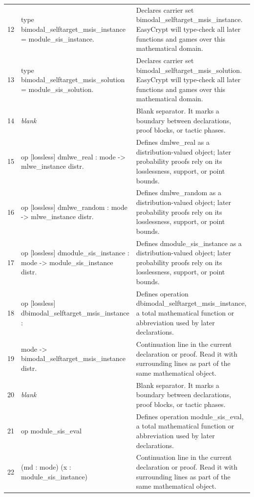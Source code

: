 \documentclass[10pt]{article}
\begin{document}
\begin{longtable}{r L{0.53\textwidth} L{0.37\textwidth}}
12 & {\ttfamily\scriptsize type bimodal\_selftarget\_msis\_instance = module\_sis\_instance.} & Declares carrier set bimodal\_selftarget\_msis\_instance.  EasyCrypt will type-check all later functions and games over this mathematical domain. \\
13 & {\ttfamily\scriptsize type bimodal\_selftarget\_msis\_solution = module\_sis\_solution.} & Declares carrier set bimodal\_selftarget\_msis\_solution.  EasyCrypt will type-check all later functions and games over this mathematical domain. \\
14 & {\ttfamily\scriptsize \emph{blank}} & Blank separator.  It marks a boundary between declarations, proof blocks, or tactic phases. \\
15 & {\ttfamily\scriptsize op [lossless] dmlwe\_real : mode -> mlwe\_instance distr.} & Defines dmlwe\_real as a distribution-valued object; later probability proofs rely on its losslessness, support, or point bounds. \\
16 & {\ttfamily\scriptsize op [lossless] dmlwe\_random : mode -> mlwe\_instance distr.} & Defines dmlwe\_random as a distribution-valued object; later probability proofs rely on its losslessness, support, or point bounds. \\
17 & {\ttfamily\scriptsize op [lossless] dmodule\_sis\_instance : mode -> module\_sis\_instance distr.} & Defines dmodule\_sis\_instance as a distribution-valued object; later probability proofs rely on its losslessness, support, or point bounds. \\
18 & {\ttfamily\scriptsize op [lossless] dbimodal\_selftarget\_msis\_instance :} & Defines operation dbimodal\_selftarget\_msis\_instance, a total mathematical function or abbreviation used by later declarations. \\
19 & {\ttfamily\scriptsize   mode -> bimodal\_selftarget\_msis\_instance distr.} & Continuation line in the current declaration or proof.  Read it with surrounding lines as part of the same mathematical object. \\
20 & {\ttfamily\scriptsize \emph{blank}} & Blank separator.  It marks a boundary between declarations, proof blocks, or tactic phases. \\
21 & {\ttfamily\scriptsize op module\_sis\_eval} & Defines operation module\_sis\_eval, a total mathematical function or abbreviation used by later declarations. \\
22 & {\ttfamily\scriptsize    (md : mode) (x : module\_sis\_instance)} & Continuation line in the current declaration or proof.  Read it with surrounding lines as part of the same mathematical object. \\

\end{longtable}
\end{document}
